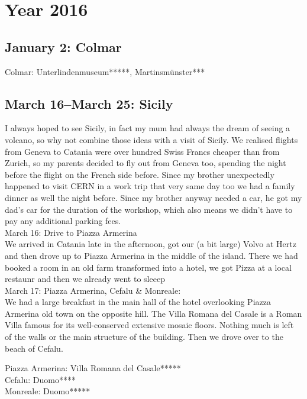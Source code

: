 \chapter{Year 2016}
\label{2016}

\section{January 2: Colmar}
\label{Colmar2016}

Colmar: Unterlindenmuseum*****, Martinsm\"unster***

\section{March 16--March 25: Sicily}
\label{Sicily2016}

I always hoped to see Sicily, in fact my mum had always the dream of seeing a volcano, so why not combine those ideas with a visit of Sicily. We realised flights from Geneva to Catania were over hundred Swiss Francs cheaper than from Zurich, so my parents decided to fly out from Geneva too, spending the night before the flight on the French side before. Since my brother unexpectedly happened to visit CERN in a work trip that very same day too we had a family dinner as well the night before. Since my brother anyway needed a car, he got my dad's car for the duration of the workshop, which also means we didn't have to pay any additional parking fees.\\

March 16: Drive to Piazza Armerina\\
We arrived in Catania late in the afternoon, got our (a bit large) Volvo at Hertz and then drove up to Piazza Armerina in the middle of the island. There we had booked a room in an old farm transformed into a hotel, we got Pizza at a local restaunr and then we already went to sleeep\\

March 17: Piazza Armerina, Cefalu \& Monreale:\\
We had a large breakfast in the main hall of the hotel overlooking Piazza Armerina old town on the opposite hill. The Villa Romana del Casale is a Roman Villa famous for its well-conserved extensive mosaic floors. Nothing much is left of the walls or the main structure of the building. Then we drove over to the beach of Cefalu. 

Piazza Armerina: Villa Romana del Casale*****\\
Cefalu: Duomo****\\
Monreale: Duomo*****\\


